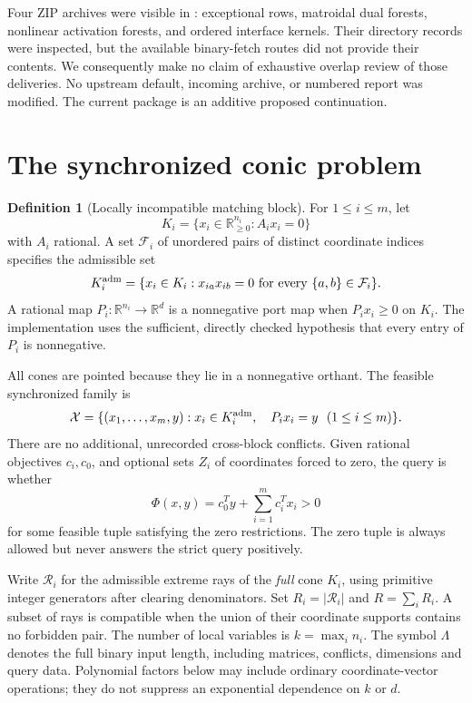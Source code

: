 \documentclass[11pt,a4paper]{article}
\theoremstyle{definition}
\newtheorem{definition}[theorem]{Definition}
\theoremstyle{remark}
\newcommand{\R}{\mathbb R}\newcommand{\Q}{\mathbb Q}\newcommand{\Z}{\mathbb Z}
\begin{document}
Four ZIP archives were visible in : exceptional rows, matroidal dual forests, nonlinear activation forests, and ordered interface kernels. Their directory records were inspected, but the available binary-fetch routes did not provide their contents. We consequently make no claim of exhaustive overlap review of those deliveries. No upstream default, incoming archive, or numbered report was modified. The current package is an additive proposed continuation.



\section{The synchronized conic problem}
\label{sec:model}

\begin{definition}[Locally incompatible matching block]
For $1\le i\le m$, let
\[
 K_i=\{x_i\in\R^{n_i}_{\ge0}:A_i x_i=0\}
\]
with $A_i$ rational. A set $\mathcal F_i$ of unordered pairs of distinct coordinate indices specifies the admissible set
\[
 K_i^{\rm adm}=\{x_i\in K_i:x_{ia}x_{ib}=0\text{ for every }\{a,b\}\in\mathcal F_i\}.
\]
A rational map $P_i:\R^{n_i}\to\R^d$ is a nonnegative port map when $P_i x_i\ge0$ on $K_i$. The implementation uses the sufficient, directly checked hypothesis that every entry of $P_i$ is nonnegative.
\end{definition}

All cones are pointed because they lie in a nonnegative orthant. The feasible synchronized family is
\begin{equation}
 \mathcal X=\{(x_1,\ldots,x_m,y):x_i\in K_i^{\rm adm},\quad P_i x_i=y\ \ (1\le i\le m)\}.
 \label{eq:model}
\end{equation}
There are no additional, unrecorded cross-block conflicts. Given rational objectives $c_i,c_0$, and optional sets $Z_i$ of coordinates forced to zero, the query is whether
\begin{equation}
 \Phi(x,y)=c_0^Ty+\sum_{i=1}^m c_i^Tx_i>0
 \label{eq:objective}
\end{equation}
for some feasible tuple satisfying the zero restrictions. The zero tuple is always allowed but never answers the strict query positively.

Write $\mathcal R_i$ for the admissible extreme rays of the \emph{full} cone $K_i$, using primitive integer generators after clearing denominators. Set $R_i=|\mathcal R_i|$ and $R=\sum_iR_i$. A subset of rays is compatible when the union of their coordinate supports contains no forbidden pair. The number of local variables is $k=\max_i n_i$. The symbol $\Lambda$ denotes the full binary input length, including matrices, conflicts, dimensions and query data. Polynomial factors below may include ordinary coordinate-vector operations; they do not suppress an exponential dependence on $k$ or $d$.
\end{document}
